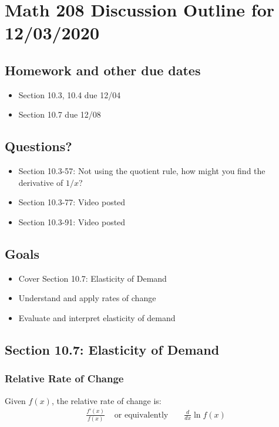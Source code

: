 \documentclass[14pt]{extarticle}
\begin{document}
\section*{Math 208 Discussion Outline for 12/03/2020}


\subsection{Homework and other due dates}
\begin{itemize}
\item Section 10.3, 10.4 due 12/04
\item Section 10.7 due 12/08
\end{itemize}

\subsection{Questions?}
\begin{itemize}
	\item Section 10.3-57: Not using the quotient rule, how might you find the derivative of $1/x$?
	\item Section 10.3-77: Video posted
	\item Section 10.3-91: Video posted
\end{itemize}

\subsection{Goals}
\begin{itemize}
	\item Cover Section 10.7: Elasticity of Demand
	\item Understand and apply rates of change
	\item Evaluate  and interpret elasticity of demand
\end{itemize}


\subsection{Section 10.7: Elasticity of Demand}
\subsubsection*{Relative Rate of Change}
Given $f(x)$, the relative rate of change is:
\begin{align*}
	&\frac{f'(x)}{f(x)} &
	\text{ or equivalently }	&
	&\frac{d}{dx}\ln f(x)
\end{align*}
\end{document}
